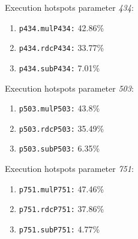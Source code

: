 Execution hotspots parameter \textit{434}:
\begin{enumerate}[noitemsep]
	\item \texttt{p434.mulP434:} 42.86\%
	\item \texttt{p434.rdcP434:} 33.77\%
	\item \texttt{p434.subP434:} 7.01\%
\end{enumerate}
Execution hotspots parameter \textit{503}:
\begin{enumerate}[noitemsep]
	\item \texttt{p503.mulP503:} 43.8\%
	\item \texttt{p503.rdcP503:} 35.49\%
	\item \texttt{p503.subP503:} 6.35\%
\end{enumerate}
Execution hotspots parameter \textit{751}:
\begin{enumerate}[noitemsep]
	\item \texttt{p751.mulP751:} 47.46\%
	\item \texttt{p751.rdcP751:} 37.86\%
	\item \texttt{p751.subP751:} 4.77\%
\end{enumerate}
